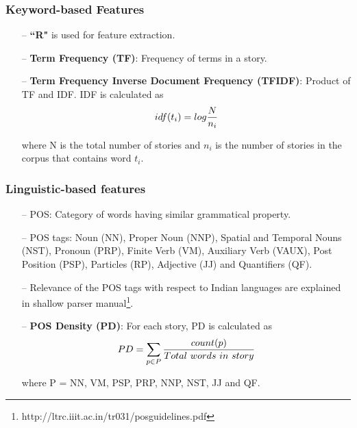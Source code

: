 \documentclass{beamer}
\begin{document}
\begin{frame}
\frametitle{Keyword-based Features}
\begin{itemize}
\item[--] \textbf{``R"} is used for feature extraction.
\item[--] \textbf{Term Frequency (TF)}: Frequency of terms in a story. 
\item[--] \textbf{Term Frequency Inverse Document Frequency (TFIDF)}: Product of TF and IDF. IDF is calculated as 
\begin{equation*}
\title{IDF}
idf(t_{i}) = log \frac{N}{n_{i}} 
\end{equation*}

where N is the total number of stories and $n_{i}$ is the number of stories in the corpus that contains word $t_{i}$. 


\end{itemize}

\end{frame}

\begin{frame} \label{POS Definition}
\frametitle{Linguistic-based features}
\begin{itemize}
\item[--] POS: Category of words having similar grammatical property.
\item[--] POS tags: Noun (NN), Proper Noun (NNP), Spatial and Temporal Nouns (NST), Pronoun (PRP), Finite Verb (VM), Auxiliary Verb (VAUX), Post Position (PSP), Particles (RP), Adjective (JJ) and Quantifiers (QF). 

\item[--] Relevance of the POS tags with respect to Indian languages are explained in shallow parser manual\footnote{http://ltrc.iiit.ac.in/tr031/posguidelines.pdf}.

\item[--] \textbf{POS Density (PD)}: For each story, PD is calculated as 
\begin{equation*}
\title{PD}
PD = \sum_{\substack{
   p \in P 
  }}
 \frac{count(p)}{Total\ words\ in\ story}  
 \end{equation*}

\begin{center}
where P = NN, VM, PSP, PRP, NNP, NST, JJ and QF. \hyperlink{POS Tag Sets}{\beamergotobutton{}} 
\end{center}
\end{itemize}
 \end{frame}
 
\end{document}
